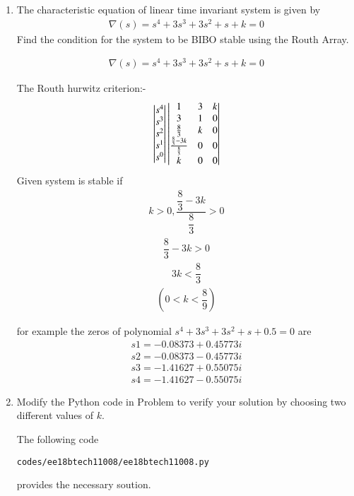 \begin{enumerate}[label=\thesubsection.\arabic*.,ref=\thesubsection.\theenumi]
\item 
The characteristic equation of linear time invariant system is given by
\begin{align} 
\nabla(s)=s^4+3s^3+3s^2+s+k=0
\end{align}
Find the condition for the system to be BIBO stable using the Routh Array.

\solution
\begin{align}
\nabla(s)=s^4+3s^3+3s^2+s+k=0
\end{align}

The Routh hurwitz criterion:-
\bigskip
\begin{align}
\begin{vmatrix}s^4\\s^3\\s^2\\s^1 \\ s^0\end{vmatrix}
\begin{vmatrix}1 & 3 & k \\ 3 & 1 & 0\\  \frac{8}{3}& k & 0\\ \frac{\frac{8}{3}-3k}{\frac{8}{3}} & 0 & 0\\k & 0 & 0\end{vmatrix} 
\end{align}
Given system is stable if
\begin{align}
k>0 ,  \dfrac{\dfrac{8}{3}-3k}{\dfrac{8}{3}}>0    
\end{align}
\begin{align}
{\dfrac{8}{3}-3k} >0
\end{align}
\begin{align}
3k<\dfrac{8}{3}
\end{align}
\begin{align}
(0<k<\dfrac{8}{9})
\end{align}

for example the zeros of polynomial $s^4+3s^3+3s^2+s+0.5=0$ are 
\begin{align}
s1=-0.08373+0.45773i
\end{align}
\begin{align}
s2=-0.08373-0.45773i
\end{align}
\begin{align}
s3=-1.41627+0.55075i
\end{align}
\begin{align}
s4=-1.41627-0.55075i
\end{align}

\item Modify the Python code in Problem to verify your solution by choosing two different values of $k$.
\label{prob:ee18btech11008_python}

\solution 
The following code 
%
\begin{lstlisting}
codes/ee18btech11008/ee18btech11008.py
\end{lstlisting}
%
provides the necessary soution.


\end{enumerate}

